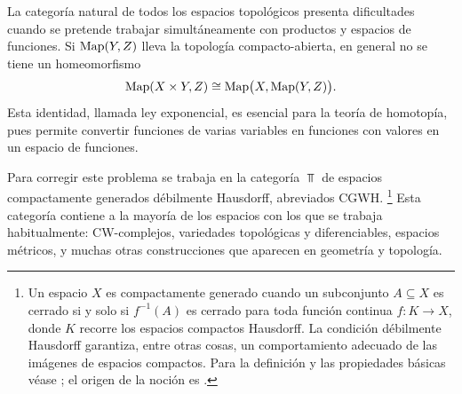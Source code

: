 La categoría natural de todos los espacios topológicos presenta dificultades cuando se pretende trabajar simultáneamente con productos y espacios de funciones. Si \(\operatorname{Map}(Y,Z)\) lleva la topología compacto-abierta, en general no se tiene un homeomorfismo
\[
\operatorname{Map}(X\times Y,Z)\cong \operatorname{Map}\bigl(X,\operatorname{Map}(Y,Z)\bigr).
\]
Esta identidad, llamada ley exponencial, es esencial para la teoría de homotopía, pues permite convertir funciones de varias variables en funciones con valores en un espacio de funciones.

Para corregir este problema se trabaja en la categoría \(\Top\) de espacios compactamente generados débilmente Hausdorff, abreviados CGWH.%
\footnote{
    Un espacio \(X\) es compactamente generado cuando un subconjunto \(A\subseteq X\) es cerrado si y solo si \(f^{-1}(A)\) es cerrado para toda función continua \(f\colon K\to X\), donde \(K\) recorre los espacios compactos Hausdorff. La condición débilmente Hausdorff garantiza, entre otras cosas, un comportamiento adecuado de las imágenes de espacios compactos. Para la definición y las propiedades básicas véase \cite{strickland_cgwh}; el origen de la noción es \cite{steenrod1967}.
}
Esta categoría contiene a la mayoría de los espacios con los que se trabaja habitualmente: CW-complejos, variedades topológicas y diferenciables, espacios métricos, y muchas otras construcciones que aparecen en geometría y topología.

